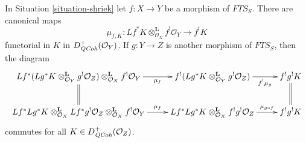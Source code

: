 \begin{lemma}
\label{lemma-map-pullback-to-shriek-well-defined}
In Situation \ref{situation-shriek} let
$f : X \to Y$ be a morphism of $\textit{FTS}_S$. There are canonical maps
$$
\mu_{f, K} :
Lf^*K \otimes_{\mathcal{O}_X}^\mathbf{L} f^!\mathcal{O}_Y
\longrightarrow
f^!K
$$
functorial in $K$ in $D^+_{\mathit{QCoh}}(\mathcal{O}_Y)$.
If $g : Y \to Z$ is another morphism of $\textit{FTS}_S$, then
the diagram
$$
\xymatrix{
Lf^*(Lg^*K \otimes_{\mathcal{O}_Y}^\mathbf{L} g^!\mathcal{O}_Z)
\otimes_{\mathcal{O}_X}^\mathbf{L} f^!\mathcal{O}_Y
\ar@{=}[d] \ar[r]_-{\mu_f} &
f^!(Lg^*K \otimes_{\mathcal{O}_Y}^\mathbf{L} g^!\mathcal{O}_Z)
\ar[r]_-{f^!\mu_g} &
f^!g^!K \ar@{=}[d] \\
Lf^*Lg^*K \otimes_{\mathcal{O}_X}^\mathbf{L} Lf^* g^!\mathcal{O}_Z
\otimes_{\mathcal{O}_X}^\mathbf{L} f^!\mathcal{O}_Y \ar[r]^-{\mu_f} &
Lf^*Lg^*K \otimes_{\mathcal{O}_X}^\mathbf{L} f^!g^!\mathcal{O}_Z
\ar[r]^-{\mu_{g \circ f}} & f^!g^!K
}
$$
commutes for all $K \in D^+_{\mathit{QCoh}}(\mathcal{O}_Z)$.
\end{lemma}

